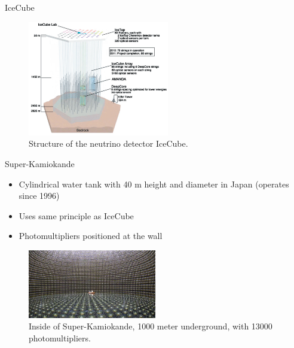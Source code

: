 \documentclass[aspectratio=1610, 10pt]{beamer}
\begin{document}
\begin{frame}{IceCube}
  \begin{figure}
    \includegraphics[width=0.55\textwidth]{images/icecube.png}
    \caption{Structure of the neutrino detector IceCube.}
  \end{figure}
\end{frame}


\begin{frame}{Super-Kamiokande}
  \begin{itemize}
    \item Cylindrical water tank with 40 m height and diameter in Japan (operates since 1996)
    \medskip
    \item Uses same principle as IceCube
    \medskip
    \item Photomultipliers positioned at the wall
  \end{itemize}
  \begin{figure}
    \includegraphics[width=0.5\textwidth]{images/kamiokande.png}
    \caption{Inside of Super-Kamiokande, 1000 meter underground, with 13000 photomultipliers.}
  \end{figure}
\end{frame}
\end{document}
